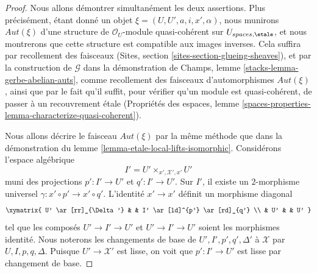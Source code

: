 \begin{proof}
Nous allons démontrer simultanément les deux assertions. Plus précisément, étant donné
un objet $\xi = (U, U', a, i, x', \alpha)$, nous munirons
$\mathit{Aut}(\xi)$ d'une structure de
$\mathcal{O}_U$-module quasi-cohérent sur $U_{spaces, \etale}$,
et nous montrerons que cette structure est compatible aux images inverses.
Cela suffira par recollement des faisceaux
(Sites, section \ref{sites-section-glueing-sheaves}),
et par la construction de $\mathcal{G}$ dans la démonstration de
Champs, lemme \ref{stacks-lemma-gerbe-abelian-auts},
comme recollement des faisceaux d'automorphismes $\mathit{Aut}(\xi)$,
ainsi que par le fait qu'il suffit, pour vérifier qu'un module est
quasi-cohérent, de passer à un recouvrement \'etale
(Propriétés des espaces, lemme
\ref{spaces-properties-lemma-characterize-quasi-coherent}).

\medskip\noindent
Nous allons décrire le faisceau $\mathit{Aut}(\xi)$ par la
même méthode que dans la démonstration du
lemme \ref{lemma-etale-local-lifts-isomorphic}.
Considérons l'espace algébrique
$$
I' = U' \times_{x', \mathcal{X}', x'} U'
$$
muni des projections $p' : I' \to U'$ et $q' : I' \to U'$.
Sur $I'$, il existe un $2$-morphisme universel
$\gamma : x' \circ p' \to x' \circ q'$.
L'identité $x' \to x'$ définit un morphisme diagonal
$$
\xymatrix{
U' \ar[rr]_{\Delta'} & & I' \ar[ld]^{p'} \ar[rd]_{q'} \\
& U' & & U'
}
$$
tel que les composés $U' \to I' \to U'$ et $U' \to I' \to U'$
soient les morphismes identité. Nous noterons les changements de base de
$U', I', p', q', \Delta'$ à $\mathcal{X}$ par $U, I, p, q, \Delta$.
Puisque $U' \to \mathcal{X}'$ est lisse, on voit que $p' : I' \to U'$
est lisse par changement de base.


\end{proof}
